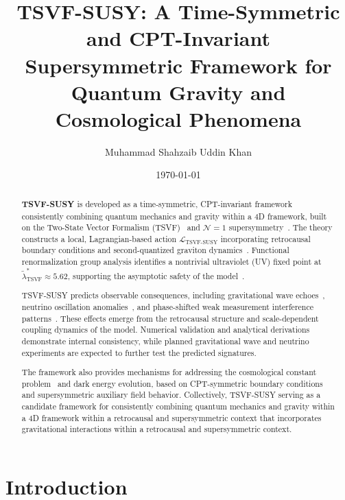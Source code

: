 \documentclass[twocolumn,superscriptaddress,floatfix]{revtex4-2}
\begin{document}
\title{TSVF-SUSY: A Time-Symmetric and CPT-Invariant Supersymmetric Framework for Quantum Gravity and Cosmological Phenomena}

\author{Muhammad Shahzaib Uddin Khan}
\date{\today}

\begin{abstract}
\textbf{TSVF-SUSY} is developed as a time-symmetric, CPT-invariant framework consistently combining quantum mechanics and gravity within a 4D framework, built on the Two-State Vector Formalism (TSVF)~\cite{Aharonov1964,Aharonov2008} and $\mathcal{N}=1$ supersymmetry~\cite{Wess1992}. The theory constructs a local, Lagrangian-based action $\mathcal{L}_{\text{TSVF-SUSY}}$ incorporating retrocausal boundary conditions and second-quantized graviton dynamics~\cite{tsvf-susy-core}. Functional renormalization group analysis identifies a nontrivial ultraviolet (UV) fixed point at $\tilde{\lambda}_{\text{TSVF}}^* \approx 5.62$, supporting the asymptotic safety of the model~\cite{Reuter1998}.

TSVF-SUSY predicts observable consequences, including gravitational wave echoes~\cite{Abedi2017,tsvf-susy-gw}, neutrino oscillation anomalies~\cite{T2K2019,tsvf-susy-neutrinos}, and phase-shifted weak measurement interference patterns~\cite{Danan2013,tsvf-susy-weak}. These effects emerge from the retrocausal structure and scale-dependent coupling dynamics of the model. Numerical validation and analytical derivations demonstrate internal consistency, while planned gravitational wave and neutrino experiments are expected to further test the predicted signatures.

The framework also provides mechanisms for addressing the cosmological constant problem~\cite{Weinberg1989} and dark energy evolution, based on CPT-symmetric boundary conditions and supersymmetric auxiliary field behavior. Collectively, TSVF-SUSY serving as a candidate framework for consistently combining quantum mechanics and gravity within a 4D framework within a retrocausal and supersymmetric context that incorporates gravitational interactions within a retrocausal and supersymmetric context.
\end{abstract}



\maketitle  


\section{Introduction}
\label{sec:intro}
\end{document}
